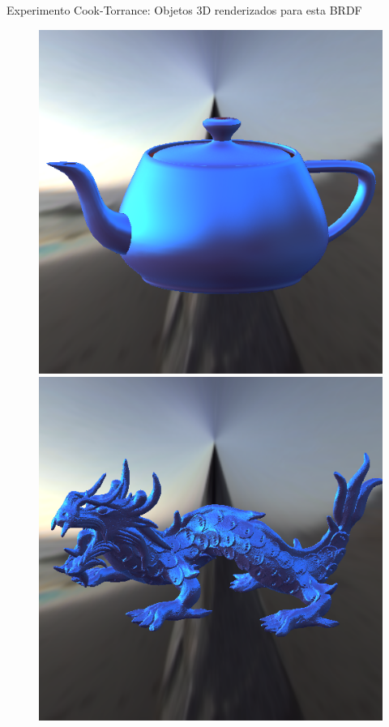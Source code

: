 \begin{frame}{Experimento Cook-Torrance: Objetos 3D renderizados para esta BRDF}
\begin{figure}[H]
    \label{fig-cook-torrance-eqlang}
  \includegraphics[width=\linewidth]{./Imagens/brdfs/cook-torrance-teapot.png}
\endminipage\hfill
{}
  \includegraphics[width=\linewidth]{./Imagens/brdfs/cook-torrance-dragon.png}

\end{figure}
\end{frame}
